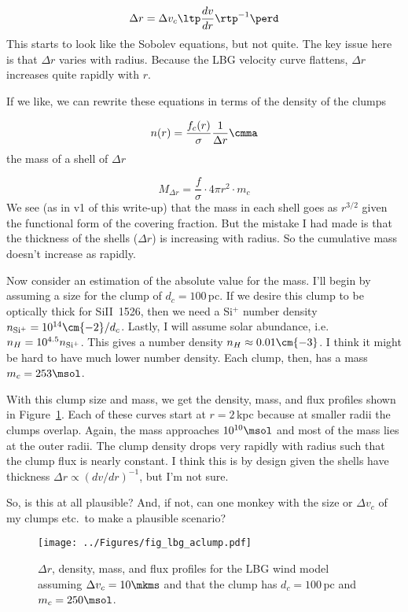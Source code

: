 \documentclass[12pt,letterpaper]{article}
\begin{document}
\begin{equation}
\Delta r = \Delta v_c \ltp \frac{dv}{dr} \rtp^{-1}  \perd
\end{equation}
This starts to look like the Sobolev equations, but not quite.  The
key issue here is that $\Delta r$ varies with radius.  Because the LBG
velocity curve flattens, $\Delta r$ increases quite rapidly with $r$.

If we like, we can rewrite these equations in terms of the density of
the clumps

\begin{equation}
n(r) = \frac{f_c(r)}{\sigma} \frac{1}{\Delta r} \cmma
\end{equation}
the mass of a shell of $\Delta r$

\begin{equation}
M_{\Delta r} = \frac{f}{\sigma} \cdot 4 \pi r^2 \cdot m_c
\end{equation}
We see (as in v1 of this write-up) that the mass in each shell goes as
$r^{3/2}$ given the functional form of the covering fraction.  But the
mistake I had made is that the thickness of the shells ($\Delta r$) is
increasing with radius.  So the cumulative mass doesn't increase as
rapidly.   

Now consider an estimation of the absolute value for the mass.  I'll
begin by assuming a size for the clump of $d_c = 100$\,pc.  If we
desire this clump to be optically thick for SiII~1526, then we need a
Si$^+$ number density $n_{\rm Si^+} = 10^{14} \cm{-2} / d_c$.  Lastly,
I will assume solar abundance, i.e. $n_H = 10^{4.5} n_{\rm Si^+}$.
This gives a number density $n_H \approx 0.01 \cm{-3}$.  I think it
might be hard to have much lower number density. Each clump,
then, has a mass $m_c = 253 \msol$. 

With this clump size and mass, we get the density, mass, and flux
profiles shown in Figure~\ref{fig:aclump}.  Each of these curves start
at $r = 2$\,kpc because at smaller radii the clumps overlap.  Again,
the mass approaches $10^{10} \msol$ and most of the mass lies at the
outer radii.  The clump density drops very rapidly with radius such
that the clump flux is nearly constant.  I think this is by design
given the shells have thickness $\Delta r \propto (dv/dr)^{-1}$, but
I'm not sure.

So, is this at all plausible?  And, if not, can one monkey with the
size or $\Delta v_c$ of my clumps etc.\ to make a plausible scenario?

\begin{figure}[ht]
\begin{center}
\texttt{[image: ../Figures/fig\_lbg\_aclump.pdf]}
\end{center}
  \caption{$\Delta r$, density, mass, and flux profiles for the LBG
    wind model assuming $\Delta v_c = 10 \mkms$ and that the clump has
    $d_c = 100$\,pc and $m_c = 250 \msol$.
}
  \label{fig:aclump}
\end{figure}
\end{document}
